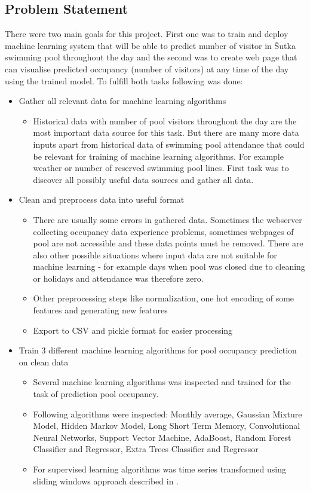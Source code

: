 \documentclass{article}
\begin{document}
\subsection{Problem Statement} \label{sec:problem_statement}

There were two main goals for this project. First one was to train and deploy machine learning system that will be able to predict number of visitor in \v{S}utka swimming pool throughout the day and the second was to create web page that can visualise predicted occupancy (number of visitors) at any time of the day using the trained model. To fulfill both tasks following was done:

\begin{itemize}
\item Gather all relevant data for machine learning algorithms
\begin{itemize}
\item Historical data with number of pool visitors throughout the day are the most important data source for this task. But there are many more data inputs apart from historical data of swimming pool attendance that could be relevant for training of machine learning algorithms. For example weather or number of reserved swimming pool lines. First task was to discover all possibly useful data sources and gather all data.
\end{itemize}

\item Clean and preprocess data into useful format
\begin{itemize}
\item There are usually some errors in gathered data. Sometimes the webserver collecting occupancy data experience problems, sometimes webpages of pool are not accessible and these data points must be removed. There are also other possible situations where input data are not suitable for machine learning - for example days when pool was closed due to cleaning or holidays and attendance was therefore zero. 
\item Other preprocessing steps like normalization, one hot encoding of some features and generating new features
\item Export to CSV and pickle format for easier processing
\end{itemize}

\item Train 3 different machine learning algorithms for pool occupancy prediction on clean data
\begin{itemize}
\item Several machine learning algorithms was inspected and trained for the task of prediction pool occupancy. 
\item Following algorithms were inspected: Monthly average, Gaussian Mixture Model, Hidden Markov Model, Long Short Term Memory, Convolutional Neural Networks, Support Vector Machine, AdaBoost, Random Forest Classifier and Regressor, Extra Trees Classifier and Regressor
\item For supervised learning algorithms was time series transformed using sliding windows approach described in \citep{brownlee2019howtosupervised}.
\end{itemize}


\end{itemize}
\end{document}
